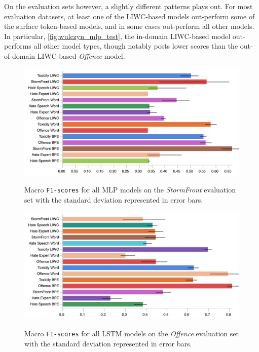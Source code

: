 On the evaluation sets however, a slightly different patterns plays out.   
For most evaluation datasets, at least one of the LIWC-based models out-perform some of the surface token-based models, and in some cases out-perform all other models.  
In particular, \cref{fig:wulczyn_mlp_test}, the in-domain LIWC-based model out-performs all other model types, though notably posts lower scores than the out-of-domain LIWC-based \textit{Offence} model.  
  
\begin{figure}  
\begin{minipage}{\textwidth}  
\centering  
  \includegraphics[width=\textwidth]{all_mlp_garcia_test.pdf}  
  \caption{Macro \texttt{F1-scores} for all MLP models on the \textit{StormFront} evaluation set with the standard deviation represented in error bars.}  
  \label{fig:garcia_mlp_test}  
  \vfill  
    \includegraphics[width=\textwidth]{all_lstm_davidson_test.pdf}  
    \caption{Macro \texttt{F1-scores} for all LSTM models on the \textit{Offence} evaluation set with the standard deviation represented in error bars.}  
    \label{fig:davidson_lstm_test}  
  \end{minipage}  
\end{figure}  
  

